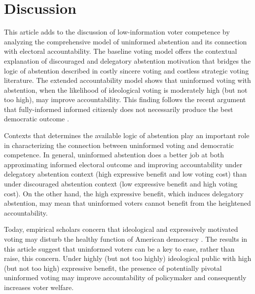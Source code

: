 \documentclass[letterpaper, 12pt]{article}
\begin{document}
    \section*{Discussion}

    \par This article adds to the discussion of low-information voter competence by analyzing the comprehensive model of uninformed abstention and its connection with electoral accountability. The baseline voting model offers the contextual explanation of discouraged and delegatory abstention motivation that bridges the logic of abstention described in costly sincere voting \citep{Downs1957anec, Riker1968thof, Matsusaka1995exvo} and costless strategic voting \citep{Feddersen1996thsw, Feddersen1999abin} literature. The extended accountability model shows that uninformed voting with abstention, when the likelihood of ideological voting is moderately high (but not too high), may improve accountability. This finding follows the recent argument that fully-informed informed citizenly does not necessarily produce the best democratic outcome \citep{Ashworth2014isvo, Prato2016thvo, Couzin2011unin}. 

    \par Contexts that determines the available logic of abstention play an important role in characterizing the connection between uninformed voting and democratic competence. In general, uninformed abstention does a better job at both approximating informed electoral outcome and improving accountability under delegatory abstention context (high expressive benefit and low voting cost) than under discouraged abstention context (low expressive benefit and high voting cost). On the other hand, the high expressive benefit, which induces delegatory abstention, may mean that uninformed voters cannot benefit from the heightened accountability.
    
    \par Today, empirical scholars concern that ideological and expressively motivated voting may disturb the healthy function of American democracy \citep{Iyengar2015fean, Achen2016defo}. The results in this article suggest that uninformed voters can be a key to ease, rather than raise, this concern. Under highly (but not too highly) ideological public with high (but not too high) expressive benefit, the presence of potentially pivotal uninformed voting may improve accountability of policymaker and consequently increases voter welfare.
    
\end{document}
